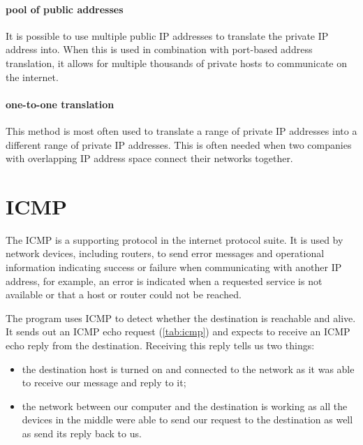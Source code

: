 \paragraph{pool of public addresses}
It is possible to use multiple public \acs{IP} addresses to translate the private \acs{IP} address into.
When this is used in combination with port-based address translation, it allows for multiple thousands of private hosts to communicate on the internet.

\paragraph{one-to-one translation}
This method is most often used to translate a range of private \acs{IP} addresses into a different range of private \acs{IP} addresses.
This is often needed when two companies with overlapping \acs{IP} address space connect their networks together.

\section{\Acl{ICMP}}
\label{sec:ip-icmp}

The \acf{ICMP} is a supporting protocol in the internet protocol suite.
It is used by network devices, including routers, to send error messages and operational information indicating success or failure when communicating with another \acs{IP} address, for example, an error is indicated when a requested service is not available or that a host or router could not be reached.

The program  uses \acs{ICMP} to detect whether the destination is reachable and alive.
It sends out an \acs{ICMP} echo request (\cref{tab:icmp}) and expects to receive an \acs{ICMP} echo reply from the destination.
Receiving this reply tells us two things:
\begin{itemize}
\item
   the destination host is turned on and connected to the network as it was able to receive our message and reply to it;
\item
   the network between our computer and the destination is working as all the devices in the middle were able to send our request to the destination as well as send its reply back to us.
\end{itemize}


